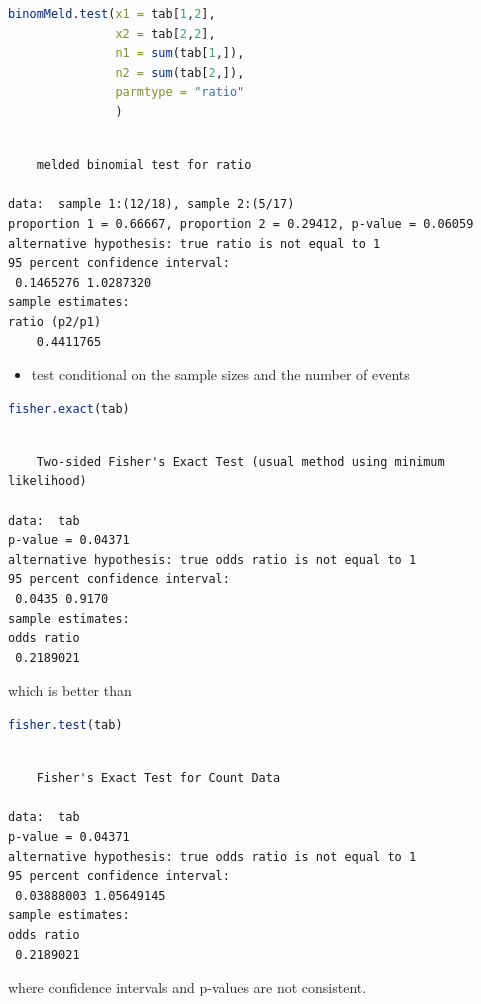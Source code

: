 \documentclass{article}
\begin{document}
\begin{lstlisting}[language=r,numbers=none]
binomMeld.test(x1 = tab[1,2],
               x2 = tab[2,2],
               n1 = sum(tab[1,]),
               n2 = sum(tab[2,]),
               parmtype = "ratio"
               )
\end{lstlisting}

\label{}
\begin{verbatim}

	melded binomial test for ratio

data:  sample 1:(12/18), sample 2:(5/17)
proportion 1 = 0.66667, proportion 2 = 0.29412, p-value = 0.06059
alternative hypothesis: true ratio is not equal to 1
95 percent confidence interval:
 0.1465276 1.0287320
sample estimates:
ratio (p2/p1) 
    0.4411765
\end{verbatim}

\bigskip

\begin{itemize}
\item test conditional on the sample sizes and the number of events
\end{itemize}
\begin{lstlisting}[language=r,numbers=none]
fisher.exact(tab)
\end{lstlisting}

\label{}
\begin{verbatim}

	Two-sided Fisher's Exact Test (usual method using minimum likelihood)

data:  tab
p-value = 0.04371
alternative hypothesis: true odds ratio is not equal to 1
95 percent confidence interval:
 0.0435 0.9170
sample estimates:
odds ratio 
 0.2189021
\end{verbatim}

which is better than
\begin{lstlisting}[language=r,numbers=none]
fisher.test(tab)
\end{lstlisting}

\label{}
\begin{verbatim}

	Fisher's Exact Test for Count Data

data:  tab
p-value = 0.04371
alternative hypothesis: true odds ratio is not equal to 1
95 percent confidence interval:
 0.03888003 1.05649145
sample estimates:
odds ratio 
 0.2189021
\end{verbatim}
where confidence intervals and p-values are not consistent.
\end{document}
